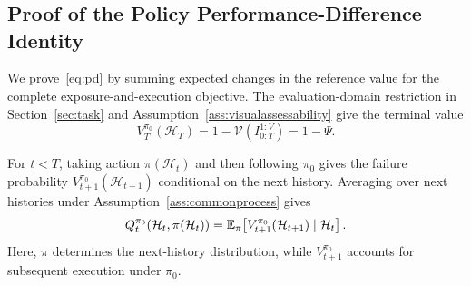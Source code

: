 
\section{}
\label{app:actionproofs}
\subsection{Proof of the Policy Performance-Difference Identity}
\label{app:pdidentity}
We prove~\eqref{eq:pd} by summing expected changes in the reference value for the complete exposure-and-execution objective.
The evaluation-domain restriction in Section~\ref{sec:task} and
Assumption~\ref{ass:visualassessability} give the terminal value
\begin{equation}
 V_T^{\pi_0}(\mathcal H_T)
 =1-\mathcal V(I_{0:T}^{1:V})=1-\Psi.
 \label{eq:appterminalvalue}
\end{equation}

For $t<T$, taking action $\pi(\mathcal H_t)$ and then following $\pi_0$
gives the failure probability $V_{t+1}^{\pi_0}(\mathcal H_{t+1})$ conditional on the next history.
Averaging over next histories under Assumption~\ref{ass:commonprocess} gives
\begin{equation}
 Q_t^{\pi_0}(\mathcal H_t,\pi(\mathcal H_t))
 =
 \mathbb E_\pi\!\left[
 V_{t+1}^{\pi_0}(\mathcal H_{t+1})
 \mid \mathcal H_t
 \right].
 \label{eq:appvaluerecursion}
\end{equation}
Here, $\pi$ determines the next-history distribution, while $V_{t+1}^{\pi_0}$
accounts for subsequent execution under $\pi_0$.

